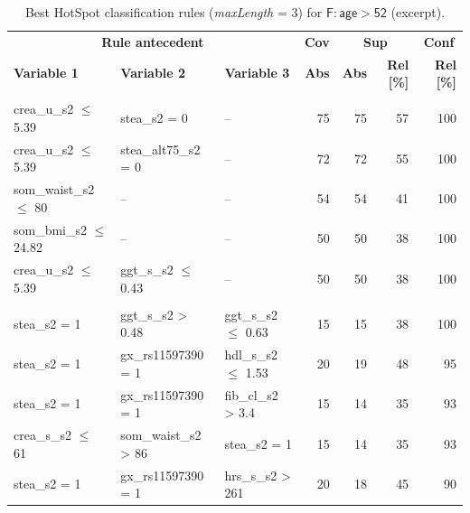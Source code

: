 \documentclass[
  oneside]{book}
\begin{document}
\begin{table}

\caption{\label{tab:03-rule-list-menopause}Best HotSpot classification rules (\emph{maxLength} = 3) for \(\mathsf{F:age>52}\) (excerpt).}
\centering
\begin{tabular}[t]{lllrrrr}
\toprule
\multicolumn{3}{c}{\textbf{Rule antecedent}} & \multicolumn{1}{c}{\textbf{Cov}} & \multicolumn{2}{c}{\textbf{Sup}} & \multicolumn{1}{c}{\textbf{Conf}} \\
\cmidrule(l{3pt}r{3pt}){1-3} \cmidrule(l{3pt}r{3pt}){4-4} \cmidrule(l{3pt}r{3pt}){5-6} \cmidrule(l{3pt}r{3pt}){7-7}
\textbf{Variable 1} & \textbf{Variable 2} & \textbf{Variable 3} & \textbf{Abs} & \textbf{Abs} & \textbf{Rel [\%]} & \textbf{Rel [\%]}\\
\midrule
\addlinespace[0.3em]
\multicolumn{7}{l}{\textbf{Target class: A}}\\
\hspace{1em}crea\_u\_s2 $\leq$ 5.39 & stea\_s2 = 0 & -- & 75 & 75 & 57 & 100\\
\hspace{1em}crea\_u\_s2 $\leq$ 5.39 & stea\_alt75\_s2 = 0 & -- & 72 & 72 & 55 & 100\\
\hspace{1em}som\_waist\_s2 $\leq$ 80 & -- & -- & 54 & 54 & 41 & 100\\
\hspace{1em}som\_bmi\_s2 $\leq$ 24.82 & -- & -- & 50 & 50 & 38 & 100\\
\hspace{1em}crea\_u\_s2 $\leq$ 5.39 & ggt\_s\_s2 $\leq$ 0.43 & -- & 50 & 50 & 38 & 100\\
\addlinespace[0.3em]
\multicolumn{7}{l}{\textbf{Target class: B}}\\
\hspace{1em}stea\_s2 = 1 & ggt\_s\_s2 > 0.48 & ggt\_s\_s2 $\leq$ 0.63 & 15 & 15 & 38 & 100\\
\hspace{1em}stea\_s2 = 1 & gx\_rs11597390 = 1 & hdl\_s\_s2 $\leq$ 1.53 & 20 & 19 & 48 & 95\\
\hspace{1em}stea\_s2 = 1 & gx\_rs11597390 = 1 & fib\_cl\_s2 > 3.4 & 15 & 14 & 35 & 93\\
\hspace{1em}crea\_s\_s2 $\leq$ 61 & som\_waist\_s2 > 86 & stea\_s2 = 1 & 15 & 14 & 35 & 93\\
\hspace{1em}stea\_s2 = 1 & gx\_rs11597390 = 1 & hrs\_s\_s2 > 261 & 20 & 18 & 45 & 90\\

\end{tabular}
\end{table}
\end{document}
